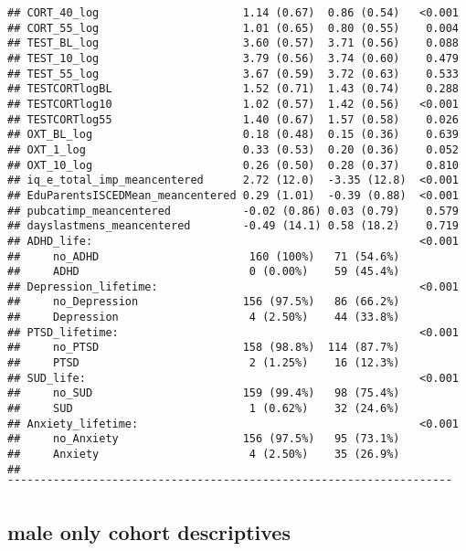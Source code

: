 \documentclass[
]{article}
\begin{document}
\begin{verbatim}
## CORT_40_log                      1.14 (0.67)  0.86 (0.54)   <0.001   
## CORT_55_log                      1.01 (0.65)  0.80 (0.55)    0.004   
## TEST_BL_log                      3.60 (0.57)  3.71 (0.56)    0.088   
## TEST_10_log                      3.79 (0.56)  3.74 (0.60)    0.479   
## TEST_55_log                      3.67 (0.59)  3.72 (0.63)    0.533   
## TESTCORTlogBL                    1.52 (0.71)  1.43 (0.74)    0.288   
## TESTCORTlog10                    1.02 (0.57)  1.42 (0.56)   <0.001   
## TESTCORTlog55                    1.40 (0.67)  1.57 (0.58)    0.026   
## OXT_BL_log                       0.18 (0.48)  0.15 (0.36)    0.639   
## OXT_1_log                        0.33 (0.53)  0.20 (0.36)    0.052   
## OXT_10_log                       0.26 (0.50)  0.28 (0.37)    0.810   
## iq_e_total_imp_meancentered      2.72 (12.0)  -3.35 (12.8)  <0.001   
## EduParentsISCEDMean_meancentered 0.29 (1.01)  -0.39 (0.88)  <0.001   
## pubcatimp_meancentered           -0.02 (0.86) 0.03 (0.79)    0.579   
## dayslastmens_meancentered        -0.49 (14.1) 0.58 (18.2)    0.719   
## ADHD_life:                                                  <0.001   
##     no_ADHD                       160 (100%)   71 (54.6%)            
##     ADHD                          0 (0.00%)    59 (45.4%)            
## Depression_lifetime:                                        <0.001   
##     no_Depression                156 (97.5%)   86 (66.2%)            
##     Depression                    4 (2.50%)    44 (33.8%)            
## PTSD_lifetime:                                              <0.001   
##     no_PTSD                      158 (98.8%)  114 (87.7%)            
##     PTSD                          2 (1.25%)    16 (12.3%)            
## SUD_life:                                                   <0.001   
##     no_SUD                       159 (99.4%)   98 (75.4%)            
##     SUD                           1 (0.62%)    32 (24.6%)            
## Anxiety_lifetime:                                           <0.001   
##     no_Anxiety                   156 (97.5%)   95 (73.1%)            
##     Anxiety                       4 (2.50%)    35 (26.9%)            
## ¯¯¯¯¯¯¯¯¯¯¯¯¯¯¯¯¯¯¯¯¯¯¯¯¯¯¯¯¯¯¯¯¯¯¯¯¯¯¯¯¯¯¯¯¯¯¯¯¯¯¯¯¯¯¯¯¯¯¯¯¯¯¯¯¯¯¯¯
\end{verbatim}

\hypertarget{male-only-cohort-descriptives}{%
\subsection{male only cohort
descriptives}\label{male-only-cohort-descriptives}}
\end{document}
